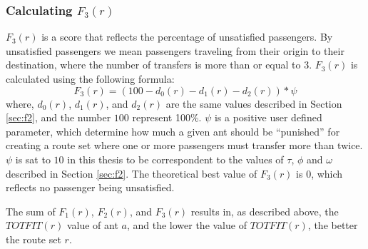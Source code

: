 \subsubsection{Calculating $F_{3}(r)$}
\label{sec:f3}
$F_3(r)$ is a score that reflects the percentage of unsatisfied passengers. By unsatisfied passengers we mean passengers traveling from their origin to their destination, where the number of transfers is more than or equal to 3. $F_3(r)$ is calculated using the following formula:
\newline
$$F_3(r) = (100 - d_0(r) - d_1(r) - d_2(r))*\psi$$
\newline
where, $d_0(r)$, $d_1(r)$, and $d_2(r)$ are the same values described in Section \vref{sec:f2}, and the number $100$ represent 100\%. $\psi$ is a positive user defined parameter, which determine how much a given ant should be ``punished'' for creating a route set where one or more passengers must transfer more than twice. $\psi$ is sat to $10$ in this thesis to be correspondent to the values of $\tau$, $\phi$ and $\omega$ described in Section \vref{sec:f2}. The theoretical best value of $F_3(r)$ is 0, which reflects no passenger being unsatisfied. 

\newline
The sum of $F_{1}(r)$, $F_{2}(r)$, and $F_{3}(r)$ results in, as described above, the $TOTFIT(r)$ value of ant $a$, and the lower the value of $TOTFIT(r)$, the better the route set $r$. 

